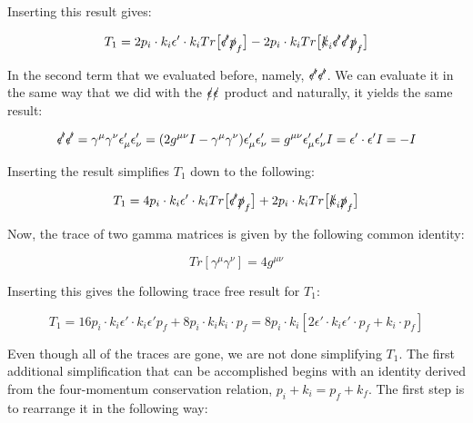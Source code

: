 \documentclass[a4]{article}
\begin{document}
    Inserting this result gives:

    \begin{equation}
        T_1 = 2 p_i \cdot k_i \epsilon' \cdot k_i Tr \big[ \slashed{\epsilon'} \slashed{p}_f \big] - 2 p_i \cdot k_i Tr \big[ \slashed{k}_i \slashed{\epsilon'} \slashed{\epsilon'} \slashed{p}_f \big]
    \end{equation}

    In the second term that we evaluated before, namely, $\slashed{\epsilon'} \slashed{\epsilon'}$. We can evaluate it in the same way that we did with the $\slashed{\epsilon} \slashed{\epsilon}$ product and naturally, it yields
    the same result:

    \begin{equation}
        \slashed{\epsilon'} \slashed{\epsilon'} = \gamma^{\mu} \gamma^{\nu} \epsilon'_\mu \epsilon'_\nu = (2 g^{\mu \nu} I - \gamma^{\mu} \gamma^{\nu}) \epsilon'_\mu \epsilon'_\nu = g^{\mu \nu} \epsilon'_\mu \epsilon'_\nu I = \epsilon' \cdot \epsilon' I = - I
    \end{equation}

    Inserting the result simplifies $T_1$ down to the following:

    \begin{equation}
        T_1 = 4 p_i \cdot k_i \epsilon' \cdot k_i Tr \big[ \slashed{\epsilon'} \slashed{p}_f \big] + 2 p_i \cdot k_i Tr \big[ \slashed{k}_i \slashed{p}_f \big]
    \end{equation}

    Now, the trace of two gamma matrices is given by the following common identity:

    \begin{equation}
        Tr [\gamma^\mu \gamma^\nu] = 4 g^{\mu \nu}
    \end{equation}

    Inserting this gives the following trace free result for $T_1$:

    \begin{equation}
        T_1 = 16 p_i \cdot k_i \epsilon' \cdot k_i \epsilon' p_f + 8 p_i \cdot k_i k_i \cdot p_f = 8 p_i \cdot k_i [2 \epsilon' \cdot k_i \epsilon' \cdot p_f + k_i \cdot p_f]
    \end{equation}

    Even though all of the traces are gone, we are not done simplifying $T_1$. The first additional simplification that can be accomplished begins with an identity derived from the
    four-momentum conservation relation, $p_i + k_i = p_f + k_f$. The first step is to rearrange it in the following way:
\end{document}
